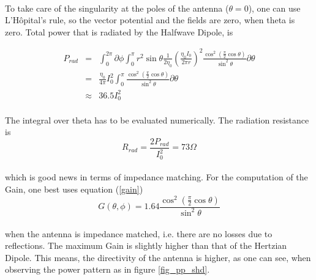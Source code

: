 \documentclass[a4paper,10pt]{thesis}
\begin{document}
\paragraph*{}
To take care of the singularity at the poles of the antenna ($\theta=0$), one can use L'H\^{o}pital's rule, so the vector potential and the fields are zero, when theta is zero. Total power that is radiated by the Halfwave Dipole, is

\begin{eqnarray}\label{total_power_hwd}
P_{rad} &=& \int_0^{2\pi } \partial \phi \int_0^{\pi} r^2 \sin \theta \frac{1}{2 \eta_0} \left( \frac{\eta_0 I_0}{2 \pi r} \right)^2  \frac{\cos^2 (\frac{\pi}{2} \cos \theta)}{\sin^2 \theta} \partial \theta  \\
&=& \frac{\eta_0}{4 \pi} I_0^2 \int_0^{\pi} \frac{\cos^2 (\frac{\pi}{2} \cos \theta)}{\sin^2 \theta} \partial \theta \nonumber \\
&\approx& 36.5 I_0^2 \nonumber
\end{eqnarray}

\paragraph*{}
The integral over theta has to be evaluated numerically. The radiation resistance is
\begin{equation}\label{radiation_resistance_hwd}
R_{rad} = \frac{2 P_{rad}}{I_0^2}=73 \Omega
\end{equation}

\paragraph*{}
which is good news in terms of impedance matching. For the computation of the Gain, one best uses equation (\ref{gain})
\begin{equation}\label{gain_hwd}
G( \theta , \phi )= 1.64 \frac{\cos^2 (\frac{\pi}{2} \cos \theta)}{\sin^2 \theta}
\end{equation}

\paragraph*{}
when the antenna is impedance matched, i.e. there are no losses due to reflections. The maximum Gain is slightly higher than that of the Hertzian Dipole. This means, the directivity of the antenna is higher, as one can see, when observing the power pattern as in figure \ref{fig_pp_shd}.
\end{document}
